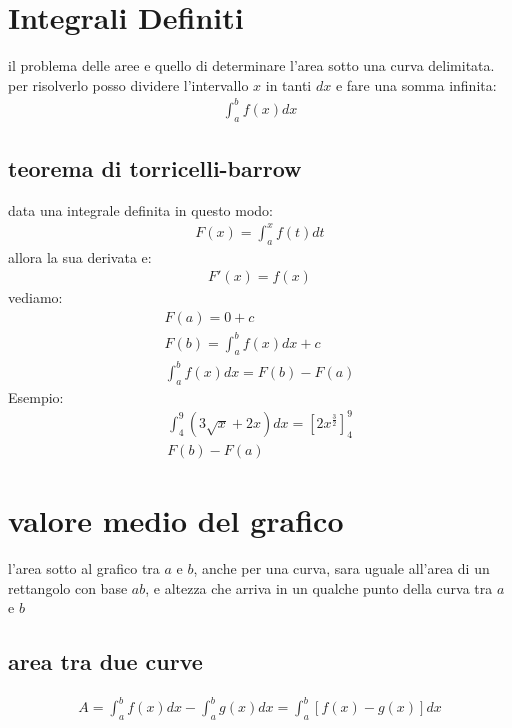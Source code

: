 \documentclass{article}
\begin{document}
\section{Integrali Definiti}
il problema delle aree e quello di determinare l'area sotto una curva delimitata. per risolverlo posso dividere l'intervallo $x$ in tanti $dx$ e fare una somma infinita:
\begin{gather*}
		\int_a^b f(x)dx
\end{gather*}
\subsection{teorema di torricelli-barrow}
data una integrale definita in questo modo:
\begin{gather*}
		F(x)=\int_a^x f(t)dt
\end{gather*}
allora la sua derivata e:
\begin{gather*}
		F'(x)=f(x)
\end{gather*}
vediamo:
\begin{gather*}
		F(a)=0+c\\
		F(b)=\int_a^b f(x)dx +c\\
		\int_a^b f(x)dx=F(b)-F(a)
\end{gather*}
Esempio:
\begin{gather*}
		\int_4^9 (3\sqrt{x}+2x)dx=\left[2x^{\frac{3}{2}}\right]_4^9\\
		F(b)-F(a)
\end{gather*}

\section{valore medio del grafico}

l'area sotto al grafico tra $a$ e $b$, anche per una curva, sara uguale all'area di un rettangolo con base $ab$, e altezza che arriva in un qualche punto della curva tra $a$ e $b$

\subsection{area tra due curve}

\begin{gather*}
A=\int_a^b f(x)dx - \int_a^b g(x)dx = \int_a^b \left[ f(x) - g(x)\right]dx
\end{gather*}
\end{document}
